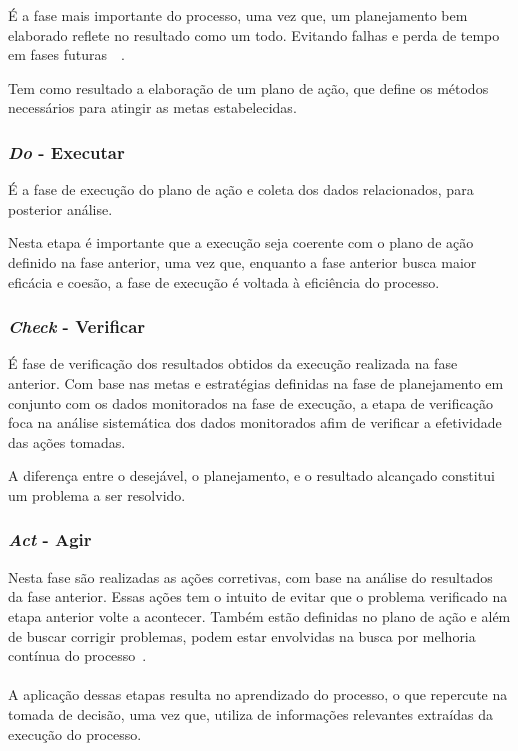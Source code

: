 É a fase mais importante do processo, uma vez que, um planejamento bem elaborado reflete no resultado como um todo. Evitando falhas e perda de tempo em fases futuras~\cite{fabio2003}~\cite{erc}.

Tem como resultado a elaboração de um plano de ação, que define os métodos necessários para atingir as metas estabelecidas.

\subsubsection{\textit{Do} - Executar}
É a fase de execução do plano de ação e coleta dos dados relacionados, para posterior análise.

Nesta etapa é importante que a execução seja coerente com o plano de ação definido na fase anterior, uma vez que, enquanto a fase anterior busca maior eficácia e coesão, a fase de execução é voltada à eficiência do processo.

\subsubsection{\textit{Check} - Verificar}
É fase de verificação dos resultados obtidos da execução realizada na fase anterior. Com base nas metas e estratégias definidas na fase de planejamento em conjunto com os dados monitorados na fase de execução, a etapa de verificação foca na análise sistemática dos dados monitorados afim de verificar a efetividade das ações tomadas.

A diferença entre o desejável, o planejamento, e o resultado alcançado constitui um problema a ser resolvido.

\subsubsection{\textit{Act} - Agir}
Nesta fase são realizadas as ações corretivas, com base na análise do resultados da fase anterior. Essas ações tem o intuito de evitar que o problema verificado na etapa anterior volte a acontecer. Também estão definidas no plano de ação e além de buscar corrigir problemas, podem estar envolvidas na busca por melhoria contínua do processo~\cite{pdcaknow}.

\paragraph{}
A aplicação dessas etapas resulta no aprendizado do processo, o que repercute na tomada de decisão, uma vez que, utiliza de informações relevantes extraídas da execução do processo.

